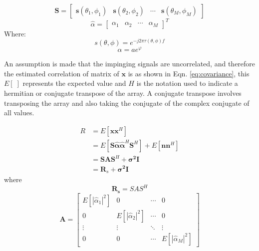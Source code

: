 \documentclass{UoNMCHA}
\numberwithin{equation}{section}
\begin{document}
    \begin{equation}
        \mathbf{S}=
        \begin{bmatrix}
            \mathbf{s}(\theta_1,\phi_1) & \mathbf{s}(\theta_2,\phi_2) & \cdots & \mathbf{s}(\theta_M,\phi_M)
        \end{bmatrix}
    \end{equation}
    \begin{equation}
        \hat{\alpha}=
        \begin{bmatrix}
        \alpha_1 & \alpha_2 & \cdots & \alpha_M
        \end{bmatrix}
        ^T
    \end{equation}
    Where:
    \begin{equation}
        s(\theta,\phi)=e^{-j2\pi \tau(\theta,\phi) f}
    \end{equation}
    \begin{equation}
        \alpha = ae^{\varphi}
    \end{equation}
    
    An assumption is made that the impinging signals are uncorrelated, and therefore the estimated correlation of matrix of $\mathbf{x}$ is as shown in Eqn. \ref{eq:covariance}, this $E[\;]$ represents the expected value and $H$ is the notation used to indicate a hermitian or conjugate transpose of the array. A conjugate transpose involves transposing the array and also taking the conjugate of the complex conjugate of all values.
    
    \begin{equation}
    \begin{split}
        R & =  E[\mathbf{xx}^H] \\
        & = E[\mathbf{S\hat{\alpha}\hat{\alpha}}^H\mathbf{S}^H] + E[\mathbf{nn}^H] \\
        & = \mathbf{SAS}^H + \mathbf{\sigma^2I}\\
        & = \mathbf{R}_s + \mathbf{\sigma^2 I}
    \end{split}
    \label{eq:covariance}
    \end{equation}
    where
    \begin{equation}
        \mathbf{R_s} = SAS^H
    \end{equation}
    \begin{equation} 
    \mathbf{A} = 
    \begin{bmatrix}
        E[|\hat{\alpha}_1|^2] & 0 & \dotsm & 0\\ 
        0 & E[|\hat{\alpha}_2|^2] & \dotsm & 0\\ 
        \vdots & \vdots & \ddots & \vdots\\ 
        0 & 0 & \dotsm & E[|\hat{\alpha}_M|^2]
    \end{bmatrix}
    \end{equation}
    
\end{document}

